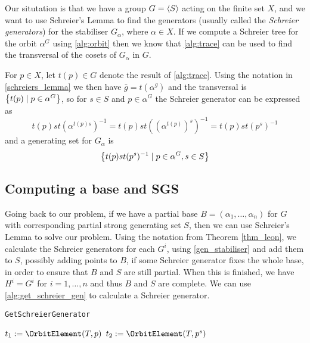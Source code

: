 Our situtation is that we have a group $G = \left\langle S \right\rangle$ acting on the finite set
$X$, and we want to use Schreier's Lemma to find the generators
(usually called the \emph{Schreier generators}) for the stabiliser
$G_{\alpha}$, where $\alpha \in X$. If we compute a Schreier tree for
the orbit $\alpha^G$ using \ref{alg:orbit} then we know that
\ref{alg:trace} can be used to find the transversal of the cosets of
$G_{\alpha}$ in $G$. 

For $p \in X$, let $t(p) \in G$ denote the result of \ref{alg:trace}.
Using the notation in \ref{schreiers_lemma} we then have $\bar{g} =
t(\alpha^g)$ and the transversal is $\left\lbrace t(p) \mid p \in \alpha^G \right\rbrace$,
so for $s \in S$ and $p \in \alpha^G$ the Schreier generator can be
expressed as
\begin{equation} 
t(p) s t(\alpha^{t(p) s})^{-1} = t(p) s t((\alpha^{t(p)})^s)^{-1} = t(p) s t(p^s)^{-1}
\end{equation}
and a generating set for $G_{\alpha}$ is
\begin{equation} \label{gen_stabiliser}
\left\lbrace t(p) s t(p^s)^{-1} \mid p \in \alpha^G, s \in S \right\rbrace
\end{equation}

\subsection{Computing a base and SGS}
Going back to our problem, if we have a partial base $B = (\alpha_1,
\dotsc, \alpha_n)$ for $G$ with corresponding partial strong
generating set $S$, then we can use Schreier's Lemma to solve our
problem. Using the notation from Theorem \ref{thm_leon}, we calculate
the Schreier generators for each $G^i$, using \eqref{gen_stabiliser} and add them to $S$, possibly
adding points to $B$, if some Schreier generator fixes the whole base,
in order to ensure that $B$ and $S$ are still partial. When this is
finished, we have $H^i = G^i$ for $i = 1, \dotsc, n$ and thus $B$ and
$S$ are complete. We can use \ref{alg:get_schreier_gen} to calculate a Schreier generator.

\begin{algorithm} 
\dontprintsemicolon
\caption{\texttt{GetSchreierGenerator}}
\Begin
{
  $t_1 := \OrbitElement(T, p)$ \;
  $t_2 := \OrbitElement(T, p^s)$ \;
}
\label{alg:get_schreier_gen}
\end{algorithm}


